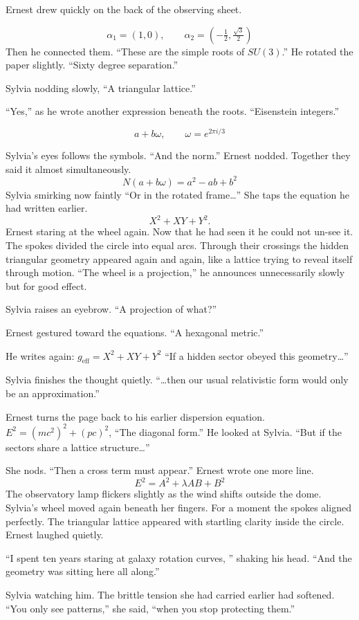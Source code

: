 Ernest drew quickly on the back of the observing sheet.

\[
\alpha_1 = (1,0), \qquad 
\alpha_2 = \left(-\tfrac12, \tfrac{\sqrt{3}}{2}\right)
\]
Then he connected them. “These are the simple roots of \(SU(3)\).”
He rotated the paper slightly.
“Sixty degree separation.”

Sylvia nodding slowly, “A triangular lattice.”

“Yes,” as he wrote another expression beneath the roots. “Eisenstein integers.”

\[
a + b\omega, \qquad 
\omega = e^{2\pi i/3}
\]

Sylvia’s eyes follows the symbols. “And the norm.”
Ernest nodded. Together they said it almost simultaneously.
\[
N(a+b\omega) = a^2 - ab + b^2
\]
Sylvia smirking now faintly “Or in the rotated frame…” She taps the equation he had written earlier.
\[
X^2 + XY + Y^2.
\]
Ernest staring at the wheel again. Now that he had seen it he could not un-see it. The spokes divided the circle into equal arcs. Through their crossings the hidden triangular geometry appeared again and again, like a lattice trying to reveal itself through motion. “The wheel is a projection,” he announces unnecessarily slowly but for good effect.

Sylvia raises an eyebrow. “A projection of what?”

Ernest gestured toward the equations. “A hexagonal metric.”

He writes again: \(
g_{\mathrm{eff}} = X^2 + XY + Y^2
\)
“If a hidden sector obeyed this geometry…”

Sylvia finishes the thought quietly. “…then our usual relativistic form would only be an approximation.”

Ernest turns the page back to his earlier dispersion equation.
\(
E^2 = (mc^2)^2 + (pc)^2
\), “The diagonal form.” He looked at Sylvia. “But if the sectors share a lattice structure…”

She nods. “Then a cross term must appear.” Ernest wrote one more line.
\[
E^2 = A^2 + \lambda AB + B^2
\]
The observatory lamp flickers slightly as the wind shifts outside the dome. Sylvia’s wheel moved again beneath her fingers. For a moment the spokes aligned perfectly. The triangular lattice appeared with startling clarity inside the circle. Ernest laughed quietly. 

“I spent ten years staring at galaxy rotation curves, ” shaking his head. “And the geometry was sitting here all along.”

Sylvia watching him. The brittle tension she had carried earlier had softened. “You only see patterns,” she said, “when you stop protecting them.”

